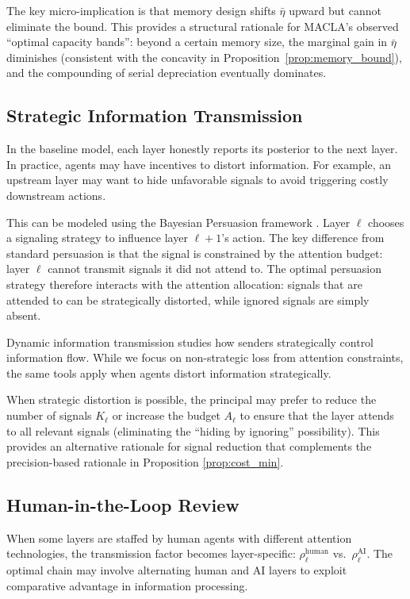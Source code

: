 The key micro-implication is that memory design shifts $\bar{\eta}$ upward but cannot eliminate the bound. This provides a structural rationale for MACLA's observed ``optimal capacity bands'': beyond a certain memory size, the marginal gain in $\bar{\eta}$ diminishes (consistent with the concavity in Proposition~\ref{prop:memory_bound}), and the compounding of serial depreciation eventually dominates.

\subsection{Strategic Information Transmission}
\label{sec:strategic}

In the baseline model, each layer honestly reports its posterior to the next layer. In practice, agents may have incentives to distort information. For example, an upstream layer may want to hide unfavorable signals to avoid triggering costly downstream actions.

This can be modeled using the Bayesian Persuasion framework \citep{kamenica2011bayesian}. Layer $\ell$ chooses a signaling strategy to influence layer $\ell+1$'s action. The key difference from standard persuasion is that the signal is constrained by the attention budget: layer $\ell$ cannot transmit signals it did not attend to. The optimal persuasion strategy therefore interacts with the attention allocation: signals that are attended to can be strategically distorted, while ignored signals are simply absent.

Dynamic information transmission \citep{ely2017beeps, renault2017optimal} studies how senders strategically control information flow. While we focus on non-strategic loss from attention constraints, the same tools apply when agents distort information strategically.

When strategic distortion is possible, the principal may prefer to reduce the number of signals $K_\ell$ or increase the budget $A_\ell$ to ensure that the layer attends to all relevant signals (eliminating the ``hiding by ignoring'' possibility). This provides an alternative rationale for signal reduction that complements the precision-based rationale in Proposition \ref{prop:cost_min}.

\subsection{Human-in-the-Loop Review}
\label{subsec:human_ai}

When some layers are staffed by human agents with different attention technologies, the transmission factor becomes layer-specific: $\rho^{\text{human}}_\ell$ vs.~$\rho^{\text{AI}}_\ell$. The optimal chain may involve alternating human and AI layers to exploit comparative advantage in information processing.

